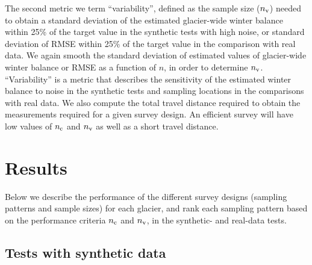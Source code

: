 \documentclass[twocolumn,letterpaper]{igs}
\begin{document}
The second metric we term ``variability'', defined as the sample size ($n_{\rm v}$) needed to obtain a standard deviation of the estimated glacier-wide winter balance within 25\% of the target value in the synthetic tests with high noise, or standard deviation of RMSE within 25\% of the target value in the comparison with real data. We again smooth the standard deviation of estimated values of glacier-wide winter balance or RMSE as a function of $n$, in order to determine $n_{\rm v}$. 
``Variability'' is a metric that describes the sensitivity of the estimated winter balance to noise in the synthetic tests and sampling locations in the comparisons with real data.
We also compute the total travel distance required to obtain the measurements required for a given survey design. An efficient survey will have low values of  $n_{\rm c}$ and $n_{\rm v}$ as well as a short travel distance. 

\section{Results }

Below we describe the performance of the different survey designs (sampling patterns and sample sizes) for each glacier, and rank each sampling pattern based on the performance criteria $n_{\rm c}$ and $n_{\rm v}$, in the synthetic- and real-data tests. 

\subsection{Tests with synthetic data}
\end{document}
